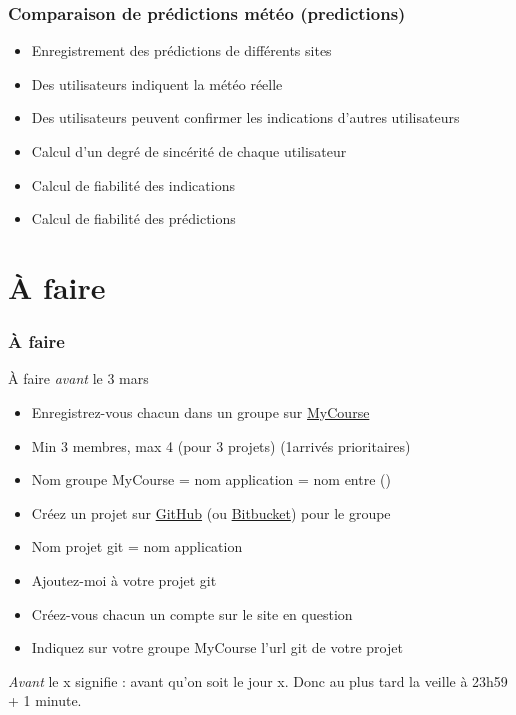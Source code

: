 \documentclass[english, french]{beamer}
\begin{document}
\begin{frame}
	\frametitle{Comparaison de prédictions météo (predictions)}
	\begin{itemize}
		\item Enregistrement des prédictions de différents sites
		\item Des utilisateurs indiquent la météo réelle
		\item Des utilisateurs peuvent confirmer les indications d’autres utilisateurs
		\item Calcul d’un degré de sincérité de chaque utilisateur
		\item Calcul de fiabilité des indications
		\item Calcul de fiabilité des prédictions
	\end{itemize}
\end{frame}

\section{À faire}
\begin{frame}
	\frametitle{À faire}
	\begin{block}{À faire \emph{avant} le 3 mars}
		\begin{itemize}
			\item Enregistrez-vous chacun dans un groupe sur \href{https://mycourse.dauphine.fr/webapps/blackboard/execute/launcher?type=Course&id=_35222_1}{MyCourse}
			\item Min 3 membres, max 4 {\tiny (pour 3 projets)} (1\iers arrivés prioritaires)
			\item Nom groupe MyCourse = nom application = nom entre ()
			\item Créez un projet sur \href{https://github.com/}{GitHub} (ou \href{https://bitbucket.org/}{Bitbucket}) pour le groupe
			\item Nom projet git = nom application
			\item Ajoutez-moi à votre projet git
			\item Créez-vous chacun un compte sur le site en question
			\item Indiquez sur votre groupe MyCourse l’url git de votre projet
		\end{itemize}
	\end{block}
	\emph{Avant} le x signifie : avant qu’on soit le jour x. Donc au plus tard la veille à 23h59 + 1 minute.
\end{frame}
\end{document}
